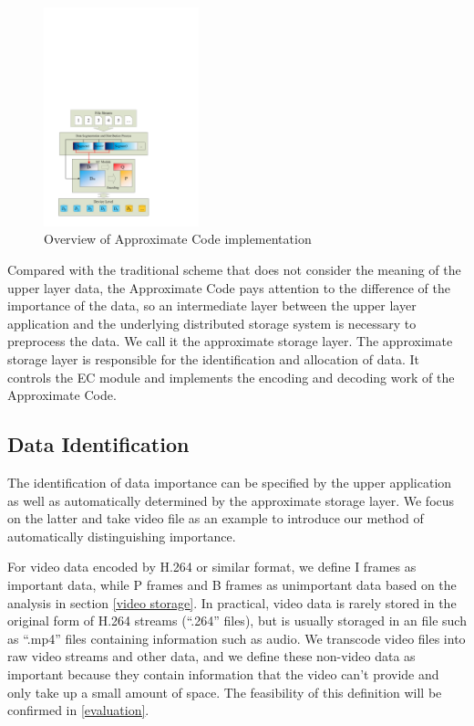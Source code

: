 \documentclass[sigconf]{acmart}
\begin{document}
\begin{figure}[htb]
\centering
\includegraphics[width=0.4\textwidth]{photo/implementation.pdf}
\caption{Overview of Approximate Code implementation}
\label{fig-implementation}
\end{figure}

Compared with the traditional scheme that does not consider the meaning of the upper layer data, the Approximate Code pays attention to the difference of the importance of the data, so an intermediate layer between the upper layer application and the underlying distributed storage system is necessary to preprocess the data. We call it the approximate storage layer.
The approximate storage layer is responsible for the identification and allocation of data. It controls the EC module and implements the encoding and decoding work of the Approximate Code. 

\subsection{Data Identification}
The identification of data importance can be specified by the upper application as well as automatically determined by the approximate storage layer. We focus on the latter and take video file as an example to introduce our method of automatically distinguishing importance.

For video data encoded by H.264 or similar format, we define I frames as important data, while P frames and B frames as unimportant data based on the analysis in section \ref{video storage}. In practical, video data is rarely stored in the original form of H.264 streams (``.264'' files), but is usually storaged in an file such as ``.mp4'' files containing information such as audio. We transcode video files into raw video streams and other data, and we define these non-video data as important because they contain information that the video can't provide and only take up a small amount of space. The feasibility of this definition will be confirmed in \ref{evaluation}.
\end{document}
